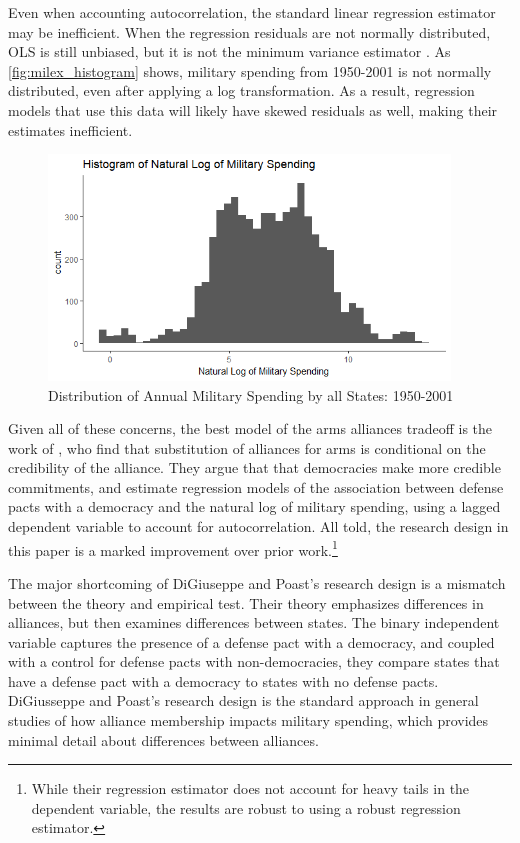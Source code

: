 \documentclass[12pt]{article}
\begin{document}
Even when accounting autocorrelation, the standard linear regression estimator may be inefficient. When the regression residuals are not normally distributed, OLS is still unbiased, but it is not the minimum variance estimator \citep{RaineyBaissa2017}. As \autoref{fig:milex_histogram} shows, military spending from 1950-2001 is not normally distributed, even after applying a log transformation. As a result, regression models that use this data will likely have skewed residuals as well, making their estimates inefficient. 

\begin{figure}
	\centering
		\includegraphics[width=0.95\textwidth]{milex_histogram.png}
	\caption{Distribution of Annual Military Spending by all States: 1950-2001}
	\label{fig:milex_histogram}
\end{figure}

Given all of these concerns, the best model of the arms alliances tradeoff is the work of \citet{DigiuseppePoast2016}, who find that substitution of alliances for arms is conditional on the credibility of the alliance. They argue that that democracies make more credible commitments, and estimate regression models of the association between defense pacts with a democracy and the natural log of military spending, using a lagged dependent variable to account for autocorrelation. All told, the research design in this paper is a marked improvement over prior work.\footnote{While their regression estimator does not account for heavy tails in the dependent variable, the results are robust to using a robust regression estimator.} 

The major shortcoming of DiGiuseppe and Poast's research design is a mismatch between the theory and empirical test. Their theory emphasizes differences in alliances, but then examines differences between states. The binary independent variable captures the presence of a defense pact with a democracy, and coupled with a control for defense pacts with non-democracies, they compare states that have a defense pact with a democracy to states with no defense pacts. DiGiusseppe and Poast's research design is the standard approach in general studies of how alliance membership impacts military spending, which provides minimal detail about differences between alliances.
\end{document}
